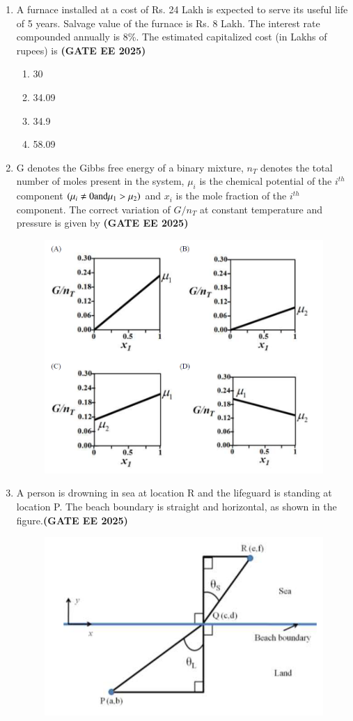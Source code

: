 \documentclass[journal,12pt,onecolumn]{IEEEtran}
\theoremstyle{remark}
\begin{document}
\begin{enumerate}
\item A furnace installed at a cost of Rs. 24 Lakh is expected to serve its useful life of 5 years. Salvage value of the furnace is Rs. 8 Lakh. The interest rate compounded annually is 8\%. The estimated capitalized cost (in Lakhs of rupees) is
\hfill \textbf{(GATE EE 2025)} \begin{enumerate}
    \item 30
    \item 34.09
    \item 34.9
    \item 58.09
\end{enumerate}


\item G denotes the Gibbs free energy of a binary mixture, $n_T$ denotes the total number of moles present in the system, $\mu_{i}$ is the chemical potential of the $i^{th}$ component $\brak{\mu_{i}\ne0 \text{and} \mu_{1}>\mu_{2}}$ and $x_i$ is the mole fraction of the $i^{th}$ component. The correct variation of $G/n_{T}$  at constant temperature and pressure is given by \hfill \textbf{(GATE EE 2025)}
	\begin{figure}
\begin{center}
	\includegraphics[width=0.7\columnwidth]{figs/29.png}
         \caption{}
\end{center}
	\end{figure}
\item A person is drowning in sea at location R and the lifeguard is standing at location P. The beach boundary is straight and horizontal, as shown in the figure.\hfill \textbf{(GATE EE 2025)}
	\begin{figure}
\begin{center} 
\includegraphics[width=0.7\columnwidth]{figs/30.png}

\end{center}
\end{figure}
\end{enumerate}
\end{document}
